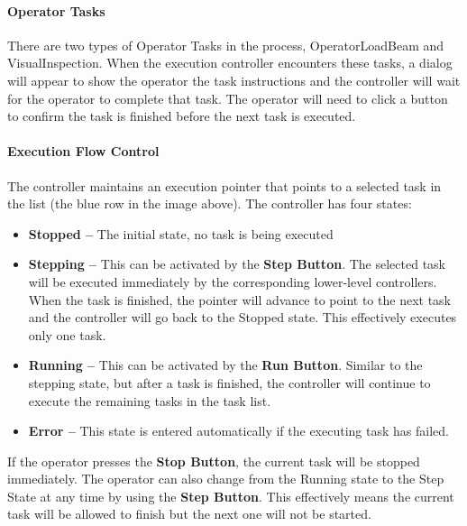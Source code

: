 \paragraph{Operator Tasks}

There are two types of Operator Tasks in the process, OperatorLoadBeam and VisualInspection. When the execution controller encounters these tasks, a dialog will appear to show the operator the task instructions and the controller will wait for the operator to complete that task. The operator will need to click a button to confirm the task is finished before the next task is executed. 

\paragraph{Execution Flow Control}

The controller maintains an execution pointer that points to a selected task in the list (the blue row in the image above). The controller has four states:

\begin{itemize}
	\item \textbf{Stopped --} The initial state, no task is being executed

	\item \textbf{Stepping --} This can be activated by the \textbf{Step Button}. The selected task will be executed immediately by the corresponding lower-level controllers. When the task is finished, the pointer will advance to point to the next task and the controller will go back to the Stopped state. This effectively executes only one task.

	\item \textbf{Running --} This can be activated by the \textbf{Run Button}. Similar to the stepping state, but after a task is finished, the controller will continue to execute the remaining tasks in the task list.

	\item \textbf{Error --} This state is entered automatically if the executing task has failed.

\end{itemize}
If the operator presses the \textbf{Stop Button}, the current task will be stopped immediately. The operator can also change from the Running state to the Step State at any time by using the \textbf{Step Button}. This effectively means the current task will be allowed to finish but the next one will not be started. 

